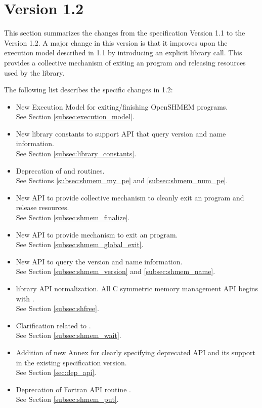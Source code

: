 \section{Version 1.2}
This section summarizes the changes from the \openshmem specification Version 1.1 to the Version 1.2.  
A major change in this version is that it improves upon the execution model described in 1.1 by introducing an explicit  library call. This provides a collective mechanism of exiting an \openshmem program and releasing resources used by the library.  



The following list describes the specific changes in 1.2:
\begin{itemize}
\item New Execution Model for exiting/finishing OpenSHMEM programs.
\\See Section  \ref{subsec:execution_model}.
\item New library constants to support API that query version and name information. 
\\See Section \ref{subsec:library_constants}.
\item Deprecation of  and  routines.
\\See Sections \ref{subsec:shmem_my_pe} and \ref{subsec:shmem_num_pe}.
\item New API  to provide collective mechanism to cleanly exit an \openshmem program and release resources.
\\See Section \ref{subsec:shmem_finalize}.
\item New API  to provide mechanism to exit an \openshmem program.
\\See Section \ref{subsec:shmem_global_exit}.
\item New API to query the version and name information. 
\\See Section \ref{subsec:shmem_version} and \ref{subsec:shmem_name}.
\item \openshmem library API normalization. All C symmetric memory management API begins with  .
\\See Section \ref{subsec:shfree}.
\item Clarification related to .
\\See Section \ref{subsec:shmem_wait}.
\item Addition of new Annex for clearly specifying deprecated API and its support in the existing specification version.
\\See Section \ref{sec:dep_api}.
\item Deprecation of Fortran API routine .
\\See Section \ref{subsec:shmem_put}. 

\end{itemize}

